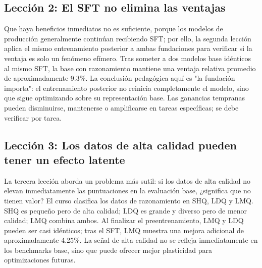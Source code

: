 \subsection{Lección 2: El SFT no elimina las ventajas}

Que haya beneficios inmediatos no es suficiente, porque los modelos de producción generalmente continúan recibiendo SFT; por ello, la segunda lección aplica el mismo entrenamiento posterior a ambas fundaciones para verificar si la ventaja es solo un fenómeno efímero. Tras someter a dos modelos base idénticos al mismo SFT, la base con razonamiento mantiene una ventaja relativa promedio de aproximadamente 9.3\%. La conclusión pedagógica aquí es "la fundación importa": el entrenamiento posterior no reinicia completamente el modelo, sino que sigue optimizando sobre su representación base. Las ganancias tempranas pueden disminuirse, mantenerse o amplificarse en tareas específicas; se debe verificar por tarea.



\subsection{Lección 3: Los datos de alta calidad pueden tener un efecto latente}

La tercera lección aborda un problema más sutil: si los datos de alta calidad no elevan inmediatamente las puntuaciones en la evaluación base, ¿significa que no tienen valor? El curso clasifica los datos de razonamiento en SHQ, LDQ y LMQ. SHQ es pequeño pero de alta calidad; LDQ es grande y diverso pero de menor calidad; LMQ combina ambos. Al finalizar el preentrenamiento, LMQ y LDQ pueden ser casi idénticos; tras el SFT, LMQ muestra una mejora adicional de aproximadamente 4.25\%. La señal de alta calidad no se refleja inmediatamente en los benchmarks base, sino que puede ofrecer mejor plasticidad para optimizaciones futuras.


